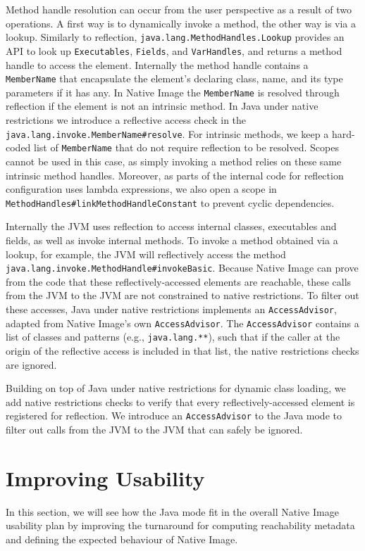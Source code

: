 Method handle resolution can occur from the user perspective as a result of two operations. A first way is to dynamically invoke a method, the other way is via a lookup.
Similarly to reflection, \verb|java.lang.MethodHandles.Lookup| provides an API to look up \verb|Executables|, \verb|Fields|, and \verb|VarHandles|, and returns a method handle to access the element. Internally the method handle contains a \verb|MemberName| that encapsulate the element's declaring class, name, and its type parameters if it has any. 
In Native Image the \verb|MemberName| is resolved through reflection if the element is not an intrinsic method. In Java under native restrictions we introduce a reflective access check in the \verb|java.lang.invoke.MemberName#resolve|. 
For intrinsic methods, we keep a hard-coded list of \verb|MemberName| that do not require reflection to be resolved. Scopes cannot be used in this case, as simply invoking a method relies on these same intrinsic method handles.
Moreover, as parts of the internal code for reflection configuration uses lambda expressions, we also open a scope in \verb|MethodHandles#linkMethodHandleConstant| to prevent cyclic dependencies.

Internally the JVM uses reflection to access internal classes, executables and fields, as well as invoke internal methods. To invoke a method obtained via a lookup, for example, the JVM will reflectively access the method \verb|java.lang.invoke.MethodHandle#invokeBasic|. Because Native Image can prove from the code that these reflectively-accessed elements are reachable, these calls from the JVM to the JVM are not constrained to native restrictions. To filter out these accesses, Java under native restrictions implements an \verb|AccessAdvisor|, adapted from Native Image's own \verb|AccessAdvisor|. The \verb|AccessAdvisor| contains a list of classes and patterns (e.g., \verb|java.lang.**|), such that if the caller at the origin of the reflective access is included in that list, the native restrictions checks are ignored.

Building on top of Java under native restrictions for dynamic class loading, we add native restrictions checks to verify that every reflectively-accessed element is registered for reflection. We introduce an \verb|AccessAdvisor| to the Java mode to filter out calls from the JVM to the JVM that can safely be ignored.

\section{Improving Usability}
In this section, we will see how the Java mode fit in the overall Native Image usability plan by improving the turnaround for computing reachability metadata and defining the expected behaviour of Native Image. 

